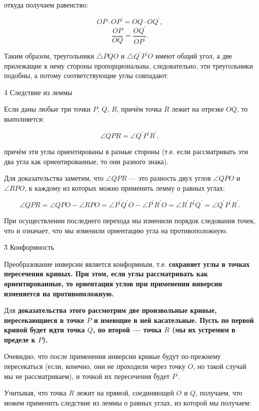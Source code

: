 откуда получаем равенство:

$$ OP \cdot OP^\prime = OQ \cdot OQ^\prime, $$
$$ \frac{ OP }{ OQ } = \frac{ OQ^\prime }{ OP^\prime }. $$

Таким образом, треугольники $\triangle PQO$ и $\triangle Q^\prime P^\prime O$ имеют общий угол, а две прилежащие к нему стороны пропорциональны, следовательно, эти треугольники подобны, а потому соответствующие углы совпадают.

\h4{ Следствие из леммы }

Если даны любые три точки $P$, $Q$, $R$, причём точка $R$ лежит на отрезке $OQ$, то выполняется:

$$ \angle QPR = \angle Q^\prime P^\prime R^\prime, $$

причём эти углы ориентированы в разные стороны (т.е. если рассматривать эти два угла как ориентированные, то они разного знака).


Для доказательства заметим, что $\angle QPR$ --- это разность двух углов $\angle QPO$ и $\angle RPO$, к каждому из которых можно применить лемму о равных углах:

$$ \angle QPR = \angle QPO - \angle RPO = \angle P^\prime Q^\prime O - \angle P^\prime R^\prime O = \angle R^\prime P^\prime Q^\prime = \angle Q^\prime P^\prime R^\prime. $$

При осуществлении последнего перехода мы изменили порядок следования точек, что и означает, что мы изменили ориентацию угла на противоположную.


\h3{ Конформность }

Преобразование инверсии является конформным, т.е. \bf{сохраняет углы в точках пересечения кривых}. При этом, если углы рассматривать как ориентированные, то ориентация углов при применении инверсии изменяется на противоположную.


Для \bf{доказательства} этого рассмотрим две произвольные кривые, пересекающиеся в точке $P$ и имеющие в ней касательные. Пусть по первой кривой будет идти точка $Q$, по второй --- точка $R$ (мы их устремим в пределе к $P$).

Очевидно, что после применения инверсии кривые будут по-прежнему пересекаться (если, конечно, они не проходили через точку $O$, но такой случай мы не рассматриваем), и точкой их пересечения будет $P^\prime$.

Учитывая, что точка $R$ лежит на прямой, соединяющей $O$ и $Q$, получаем, что можем применить следствие из леммы о равных углах, из которой мы получаем:

